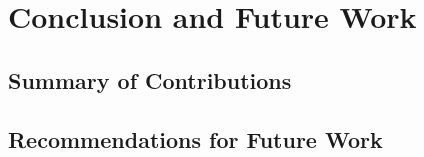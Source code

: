 \chapter{Conclusion and Future Work}
\label{cha:conclusionandfuturework}

\section{Summary of Contributions}
\label{sec:summaryofcontributions}



\section{Recommendations for Future Work}
\label{sec:recommendationsforfuturework}

